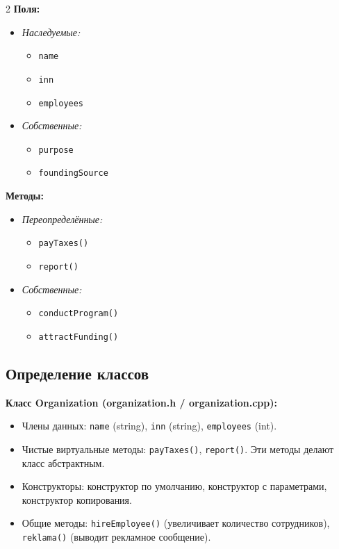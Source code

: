 \documentclass[oneside,a4paper,14pt]{extarticle}
\begin{document}
\begin{paracol}{2}
  \textbf{Поля:}
  \begin{itemize}
    \item \textit{Наследуемые:}
      \begin{itemize}
        \item \texttt{name}
        \item \texttt{inn}
        \item \texttt{employees}
      \end{itemize}
    \item \textit{Собственные:}
      \begin{itemize}
        \item \texttt{purpose}
        \item \texttt{foundingSource}
      \end{itemize}
  \end{itemize}

  \switchcolumn
  \textbf{Методы:}
  \begin{itemize}
    \item \textit{Переопределённые:}
      \begin{itemize}
        \item \texttt{payTaxes()}
        \item \texttt{report()}
      \end{itemize}
    \item \textit{Собственные:}
      \begin{itemize}
        \item \texttt{conductProgram()}
        \item \texttt{attractFunding()}
      \end{itemize}
  \end{itemize}
\end{paracol}

\newpage

\subsection*{Определение классов}

\textbf{Класс Organization (organization.h / organization.cpp):}
\begin{itemize}
	\item Члены данных: \texttt{name} (string), \texttt{inn} (string), \texttt{employees} (int).
	\item Чистые виртуальные методы: \texttt{payTaxes()}, \texttt{report()}. Эти методы делают класс абстрактным.
	\item Конструкторы: конструктор по умолчанию, конструктор с параметрами, конструктор копирования.
	\item Общие методы: \texttt{hireEmployee()} (увеличивает количество сотрудников), \texttt{reklama()} (выводит рекламное сообщение).
\end{itemize}
\end{document}
